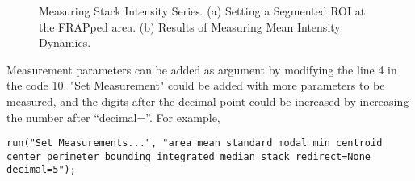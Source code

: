 \documentclass[11pt,a4paper,oneside]{report}
\begin{document}


\begin{figure}[htbp]
 \centering
 \caption{Measuring Stack Intensity Series. (a) Setting a Segmented ROI at the FRAPped area. (b) Results of Measuring Mean Intensity Dynamics.}
 \label{fig:frapresults}
\end{figure}

Measurement parameters can be added as argument by modifying the line 4 in the code 10. "Set Measurement" could be added with more parameters to be measured, and the digits after the decimal point could be increased by increasing the number after ``decimal=''. For example, 
\begin{lstlisting}[numbers=none]
run("Set Measurements...", "area mean standard modal min centroid center perimeter bounding integrated median stack redirect=None decimal=5");
\end{lstlisting}
\end{document}
